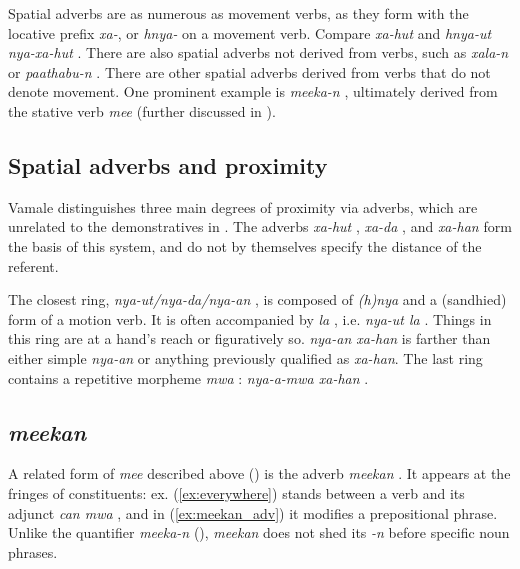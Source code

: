 Spatial adverbs are as numerous as movement verbs, as they form with the locative prefix \textit{xa-}, or \textit{hnya-}  on a movement verb. Compare \textit{xa-hut}  and \textit{hnya-ut nya-xa-hut} . There are also spatial adverbs not derived from verbs, such as \textit{xala-n}  or \textit{paathabu-n} . There are other spatial adverbs derived from verbs that do not denote movement. One prominent example is \textit{meeka-n} , ultimately derived from the stative verb \textit{mee}  (further discussed in ).

 
 \subsection{Spatial adverbs and proximity}
 \label{ssec:prox_Adv}
 
 Vamale distinguishes three main degrees of proximity via adverbs, which are unrelated to the demonstratives in . The adverbs \textit{xa-hut} , \textit{xa-da} , and \textit{xa-han}  form the basis of this system, and do not by themselves specify the distance of the referent. 
 
 The closest ring, \textit{nya-ut/nya-da/nya-an} , is composed of \textit{(h)nya}  and a (sandhied) form of a motion verb. It is often accompanied by \textit{la} , i.e. \textit{nya-ut la} . Things in this ring are at a hand's reach or figuratively so.  \textit{nya-an xa-han}  is farther than either simple \textit{nya-an} or anything previously qualified as \textit{xa-han}. The last ring contains a repetitive morpheme \textit{mwa} : \textit{nya-a-mwa xa-han} .
 \subsection{\textit{meekan} }
 \label{ssec:meekan}
A related form of \textit{mee}  described above () is the adverb \textit{meekan} . It appears at the fringes of constituents: ex. (\ref{ex:everywhere}) stands between a verb and its adjunct \textit{can mwa} , and in (\ref{ex:meekan_adv}) it modifies a prepositional phrase. Unlike the quantifier \textit{meeka-n} (), \textit{meekan} does not shed its \textit{-n} before specific noun phrases.
 
